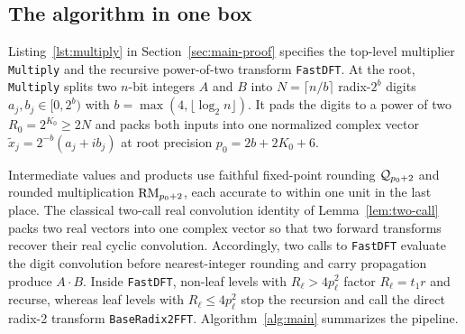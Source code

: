 \subsection{The algorithm in one box}\label{sec:overview-box}

Listing~\ref{lst:multiply} in Section~\ref{sec:main-proof} specifies the top-level multiplier \texttt{Multiply} and the recursive power-of-two transform \texttt{FastDFT}. At the root, \texttt{Multiply} splits two $n$-bit integers $A$ and $B$ into $N = \lceil n / b \rceil$ radix-$2^b$ digits $a_j, b_j \in [0, 2^b)$ with $b = \max(4, \lfloor \log_2 n \rfloor)$. It pads the digits to a power of two $R_0 = 2^{K_0} \ge 2N$ and packs both inputs into one normalized complex vector $\tilde{x}_j = 2^{-b}(a_j + i b_j)$ at root precision $p_0 = 2b + 2K_0 + 6$.

Intermediate values and products use faithful fixed-point rounding $\mathcal{Q}_{p_0+2}$ and rounded multiplication $\operatorname{RM}_{p_0+2}$, each accurate to within one unit in the last place. The classical two-call real convolution identity of Lemma~\ref{lem:two-call} packs two real vectors into one complex vector so that two forward transforms recover their real cyclic convolution. Accordingly, two calls to \texttt{FastDFT} evaluate the digit convolution before nearest-integer rounding and carry propagation produce $A \cdot B$. Inside \texttt{FastDFT}, non-leaf levels with $R_\ell > 4 p_\ell^2$ factor $R_\ell = t_1 r$ and recurse, whereas leaf levels with $R_\ell \le 4 p_\ell^2$ stop the recursion and call the direct radix-2 transform \texttt{BaseRadix2FFT}. Algorithm~\ref{alg:main} summarizes the pipeline.

